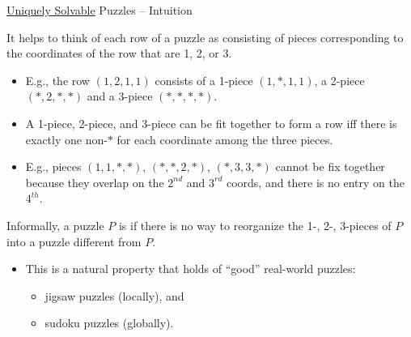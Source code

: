 \documentclass[t,10pt,
mathserif,xcolor=dvipsnames]{beamer}
\begin{document}
\begin{myframe}{\uline{Uniquely Solvable} Puzzles -- Intuition}

  
  It helps to think of each row of a puzzle as consisting of
   pieces corresponding to the coordinates of the row
  that are 1, 2, or 3.


  \begin{itemize}
  \item E.g., the row $(1, 2, 1, 1)$ consists of a 1-piece $(1, *, 1,
    1)$, a 2-piece $(*, 2, *, *)$ and a 3-piece $(*, *, *, *)$.
    
  \item A 1-piece, 2-piece, and 3-piece can be fit together to form a
    row iff there is exactly one non-$*$ for each coordinate among the
    three pieces.
  
  \item E.g., pieces $(1, 1, *, *)$, $(*, *, 2, *)$, $(*, 3, 3, *)$
    cannot be fix together because they overlap on the $2^{nd}$ and
    $3^{rd}$ coords, and there is no entry on the $4^{th}$.

  \end{itemize}

  Informally, a puzzle $P$ is \emph{} if
  there is no way to reorganize the 1-, 2-, 3-pieces of $P$ into a
  puzzle different from $P$.

  \begin{itemize}
  \item This is a natural property that holds of ``good'' real-world puzzles:
    \begin{itemize}
    \item jigsaw puzzles (locally), and
    \item sudoku puzzles (globally).
    \end{itemize}
  \end{itemize}
  
\end{myframe}
\end{document}
